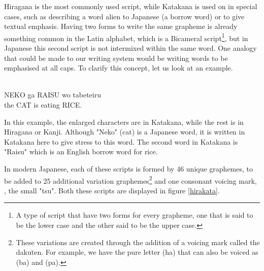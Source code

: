 Hiragana is the most commonly used script, while Katakana is used on in special cases, such as describing a word alien to Japanese (a borrow word) or to give textual emphasis. Having two forms to write the same grapheme is already something common in the Latin alphabet, which is a Bicameral script\footnote{A type of script that have two forms for every grapheme, one that is said to be the lower case and the other said to be the upper case.}, but in Japanese this second script is not intermixed within the same word. One analogy that could be made to our writing system would be writing words to be emphasised at all caps. To clarify this concept, let us look at an example.

\begin{center}
\\
NEKO ga RAISU wo tabeteiru\\
the CAT is eating RICE.
\end{center}

In this example, the enlarged characters are in Katakana, while the rest is in Hiragana or Kanji. Although "Neko" (cat) is a Japanese word, it is written in Katakana here to give stress to this word. The second word in Katakana is "Raisu" which is an English borrow word for rice.

In modern Japanese, each of these scripts is formed by 46 unique graphemes, to be added to 25 additional variation graphemes\footnote{These variations are created through the addition of a voicing mark called the dakuten. For example, we have the pure letter (ha) that can also be voiced as (ba) and (pa).} and one consonant voicing mark, , the small "tsu". Both these scripts are displayed in figure \ref{hirakata}.

